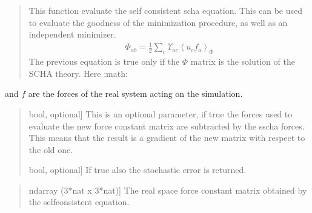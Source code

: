 \documentclass[a4paper,11pt,english]{sphinxmanual}
\begin{document}
\begin{fulllineitems}
\begin{fulllineitems}
\begin{quote}
\begin{description}
\end{description}
\end{quote}

\end{fulllineitems}


\begin{fulllineitems}
\label{\detokenize{apireference:sscha.Ensemble.Ensemble.get_fc_from_self_consistency}}
\pysigstartsignatures
{}
\pysigstopsignatures\begin{quote}

\sphinxAtStartPar
This function evaluate the self consistent scha equation. This can be used
to evaluate the goodness of the minimization procedure, as well as an
independent minimizer.
\begin{equation*}
\begin{split}\Phi_{ab} = \frac 12 \sum_c \Upsilon_{ac} \left< u_c f_a\right>_{\Phi}\end{split}
\end{equation*}
\sphinxAtStartPar
The previous equation is true only if the \(\Phi\) matrix is the solution
of the SCHA theory. Here :math:{\color{red}\bfseries{}\textasciigrave{}}
\end{quote}
\begin{description}
\sphinxAtStartPar
and \(f\) are the forces of the real system acting on the simulation.
\begin{quote}
\begin{description}
\sphinxlineitem{subtract\_sscha}{[}bool, optional{]}
\sphinxAtStartPar
This is an optional parameter, if true the forces used to evaluate the
new force constant matrix are subtracted by the sscha forces.
This means that the result is a gradient of the new matrix with respect
to the old one.

\sphinxlineitem{return\_error}{[}bool, optional{]}
\sphinxAtStartPar
If true also the stochastic error is returned.

\end{description}
\end{quote}
\begin{quote}
\begin{description}
\sphinxlineitem{fc}{[}ndarray (3*nat x 3*nat){]}
\sphinxAtStartPar
The real space force constant matrix obtained by the
self\sphinxhyphen{}consistent equation.


\end{description}
\end{quote}
\end{description}
\end{fulllineitems}
\end{fulllineitems}
\end{document}
